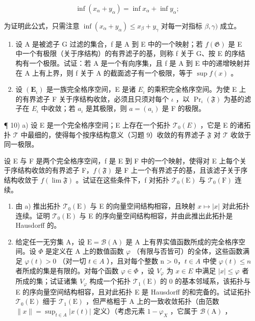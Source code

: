 \[
\inf (x _ {\alpha} + y _ {\alpha}) = \inf x _ {\alpha} + \inf y _ {\alpha};
\]

为证明此公式，只需注意 \(\inf (x_{\alpha} + y_{\alpha})\leqslant x_{\beta} + y_{\gamma}\) 对每一对指标 \(\beta ,\gamma)\) 成立。

\begin{enumerate}
\def\labelenumi{\alph{enumi})}
\setcounter{enumi}{1}
\item
  设 A 是被滤子 G 过滤的集合，f 是 A 到 E 中的一个映射；若 \(f(\mathfrak{G})\) 是 E 中一个有极限（关于序结构）的有界滤子的基，则称 f 关于 G、按 E 的序结构有一个极限。试证：若 A 是一个有向序集，且 f 是 A 到 E 中的递增映射并在 A 上有上界，则 f 关于 A 的截面滤子有一个极限，等于 \(\sup f(x)\) 。
\item
  设 \((\mathbf{E}_{\iota})\) 是一族完全格序空间，E 是诸 \(E_{\iota}\) 的乘积完全格序空间。为使 E 上的有界滤子 F 关于序结构收敛，必须且只须对每个 \(\iota\) ，以 \(\Pr_{\iota}(\mathfrak{F})\) 为基的滤子在 \(E_{\iota}\) 中收敛；若 \(a_{\iota}\) 是其极限，则 \(a = (a_{\iota})\) 是 F 的极限。
\end{enumerate}

¶ 10) a) 设 E 是一个完全格序空间；E 上存在一个拓扑 \(\mathcal{T}_0(E)\) ，它是 E 的诸拓扑 \(\mathcal{T}\) 中最细的，使得每个按序结构意义（习题 9）收敛的有界滤子 \(\mathfrak{F}\) 对 \(\mathcal{T}\) 收敛于同一极限。

设 E 与 F 是两个完全格序空间，f 是 E 到 F 中的一个映射，使得对 E 上每个关于序结构收敛的有界滤子 F，\(f(\mathfrak{F})\) 是 F 上一个有界滤子的基，且该滤子关于序结构收敛于 \(f(\lim \mathfrak{F})\) 。试证在这些条件下，f 对拓扑 \(\mathcal{T}_{0}(\mathrm{E})\) 与 \(\mathcal{T}_{0}(\mathrm{F})\) 连续。

\begin{enumerate}
\def\labelenumi{\alph{enumi})}
\setcounter{enumi}{1}
\item
  由 a) 推出拓扑 \(\mathcal{T}_{0}(\mathrm{E})\) 与 E 的向量空间结构相容，且映射 \(x \mapsto |x|\) 对此拓扑连续。证明 \(\mathcal{T}_{0}(\mathrm{E})\) 与 E 的序向量空间结构相容，并由此推出此拓扑是 Hausdorff 的。
\item
  给定任一无穷集 A，设 \(\mathrm{E} = \mathcal{B}(\mathrm{A})\) 是 A 上有界实值函数所成的完全格序空间。设 \(\Phi\) 是定义在 A 上的数值函数 \(\varphi\) （有限与否皆可）的全体，这些函数满足 \(\varphi(t) > 0\) （对一切 \(t \in A\) ），且对每个整数 n \textgreater{} 0，\(t \in A\) 中使 \(\varphi(t) \leqslant n\) 者所成的集是有限的。对每个函数 \(\varphi \in \Phi\) ，设 \(V_{\varphi}\) 为 \(x \in E\) 中满足 \(|x| \leqslant \varphi\) 者所成的集；试证诸集 \(V_{\varphi}\) 构成一个拓扑 \(\mathcal{T}_{1}(\mathrm{E})\) 的 0 的基本邻域系，该拓扑与 E 的序向量空间结构相容，且对此拓扑 E 是 Hausdorff 的和完备的。试证拓扑 \(\mathcal{T}_{0}(\mathrm{E})\) 细于 \(\mathcal{T}_{1}(\mathrm{E})\) ，但严格粗于 A 上的一致收敛拓扑（由范数 \(\|x\| = \sup_{t \in A} |x(t)|\) 定义）（考虑元素 \(1 - \varphi_{X}\) ，它属于 \(\mathcal{B}(\mathrm{A})\) ，
\end{enumerate}

